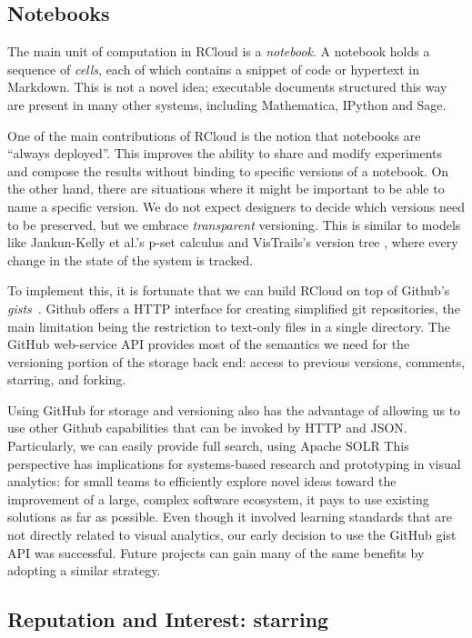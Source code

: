 \subsection{Notebooks\label{sec:notebooks}}

The main unit of computation in RCloud is a \emph{notebook}.
A notebook holds a sequence of \emph{cells}, each of which contains a
snippet of code or hypertext in Markdown. This is not a novel idea;
executable documents structured this way are present in many
other systems, including Mathematica, IPython and Sage.

One of the main contributions of RCloud is the notion that notebooks
are ``always deployed''. This improves the ability to share and modify
experiments and compose the results without binding to specific versions
of a notebook.
On the other hand, there are situations where it might be important to
be able to name a specific version. We do not expect designers to 
decide which versions need to be preserved, but we embrace
\emph{transparent} versioning.
This is similar to models like Jankun-Kelly et al.'s p-set calculus \cite{Jankun-Kelly:2007:MFV}
and VisTrails's version tree \cite{Callahan:2006:VVM}, where every change in the state of the system is tracked.

To implement this, it is fortunate that we can build RCloud on top of
Github's \emph{gists}~\cite{Github:2014:GG}. Github offers a HTTP interface
for creating simplified git repositories, the main limitation being the
restriction to text-only files in a single directory. The GitHub web-service
API provides most of the semantics we need for the versioning
portion of the storage back end: access to previous versions,
comments, starring, and forking.

Using GitHub for storage and versioning also has the advantage of allowing
us to use other Github capabilities that can be invoked by HTTP and JSON.
Particularly, we can easily provide full search, using Apache SOLR
%
This perspective has implications for
systems-based research and prototyping in visual analytics:
for small teams to efficiently explore novel ideas toward the
improvement of a large, complex software ecosystem, it pays
to use existing solutions as far as possible.
%
Even though it involved learning standards that are not directly
related to visual analytics, our early decision to use the GitHub
gist API was successful. Future projects can gain many
of the same benefits by adopting a similar strategy.

\subsection{Reputation and Interest: starring\label{sec:starring}}

